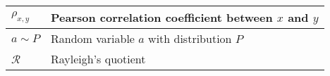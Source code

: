 \begin{xltabular}{\textwidth}{XX}
	\(\rho_{x,y}\)                                                                                                                                                                                                                          & Pearson correlation coefficient between \(x\) and \(y\)                                     \\ \hline
	\(a\sim P\)                                                                                                                                                                                                                             & Random variable \(a\) with distribution \(P\)                                               \\ \hline
	\(\mathcal{R}\)                                                                                                                                                                                                                         & Rayleigh's quotient
\end{xltabular}
